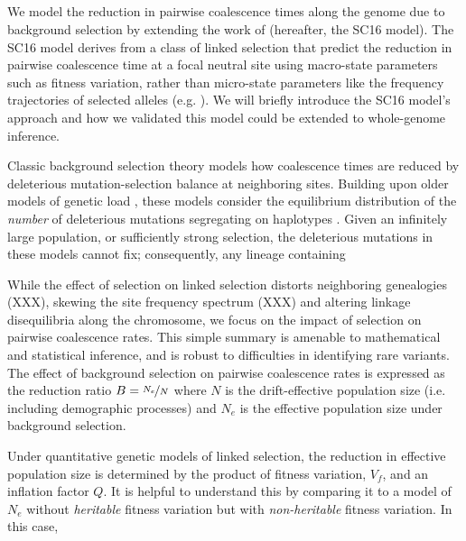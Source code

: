 \documentclass[11pt]{article}
\begin{document}
\subsection*{}

We model the reduction in pairwise coalescence times along the genome due to
background selection by extending the work of \textcite{Santiago2016-mu}
(hereafter, the SC16 model). The SC16 model derives from a class of linked
selection \parencite{Robertson1961-ho,Santiago1995-hx,Santiago1998-bs} that
predict the reduction in pairwise coalescence time at a focal neutral site
using macro-state parameters such as fitness variation, rather than micro-state
parameters like the frequency trajectories of selected alleles (e.g.
\textcite{Maynard_Smith1974-zr}). We will briefly introduce the SC16 model's
approach and how we validated this model could be extended to whole-genome
inference.

Classic background selection theory models how coalescence times are reduced by
deleterious mutation-selection balance at neighboring sites. Building upon
older models of genetic load \parencite{Crow1970-wj,Kimura1966-bk}, these
models consider the equilibrium distribution of the \emph{number} of
deleterious mutations segregating on haplotypes
\parencite{Charlesworth1993-gb,Nordborg1996-nq}. Given an infinitely large
population, or sufficiently strong selection, the deleterious mutations in
these models cannot fix; consequently, any lineage containing 

While the effect of selection on linked selection distorts neighboring
genealogies (XXX), skewing the site frequency spectrum (XXX) and altering
linkage disequilibria along the chromosome, we focus on the impact of selection
on pairwise coalescence rates. This simple summary is amenable to mathematical
and statistical inference, and is robust to difficulties in identifying rare
variants. The effect of background selection on pairwise coalescence rates is
expressed as the reduction ratio $B = \nicefrac{N_e}{N}$ where $N$ is the
drift-effective population size (i.e. including demographic processes) and
$N_e$ is the effective population size under background selection.

Under quantitative genetic models of linked selection, the reduction in
effective population size is determined by the product of fitness variation,
$V_f$, and an inflation factor $Q$. It is helpful to understand this by comparing
it to a model of $N_e$ without \emph{heritable} fitness variation but with
\emph{non-heritable} fitness variation. In this case, 
\end{document}
